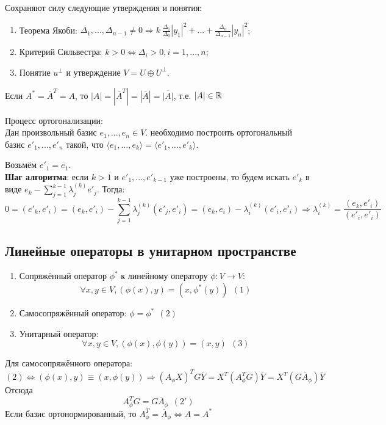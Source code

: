 Сохраняют силу следующие утверждения и понятия:
\begin{enumerate}
    \item Теорема Якоби: $\Delta_1,...,\Delta_{n-1} \neq 0 \Longrightarrow k ~ \frac{\Delta_1}{\Delta_0}|y_1|^2 + ... + \frac{\Delta_n}{\Delta_{n-1}}|y_n|^2$;
    \item Критерий Сильвестра: $k > 0 \Longleftrightarrow \Delta_i > 0, i = 1,...,n$;
    \item Понятие $u^\perp$ и утверждение $V = U \oplus U^\perp$.
\end{enumerate}
\begin{remark}
    Если $A^* = \overline{A}^T = A$, то $|A| = |\overline{A}^T| = |\overline{A}| = \overline{|A|}$, т.е. $|A| \in \mathbb{R}$
\end{remark}
\begin{algorithm} Процесс ортогонализации:\\
    Дан произвольный базис $e_1,...,e_n \in V$. необходимо построить ортогональный базис $e'_1,...,e'_n$ такой, что $\langle e_1,...,e_k \rangle = \langle e'_1,...,e'_k \rangle$.
\end{algorithm}
Возьмём $e'_1 = e_1$.\\
\textbf{Шаг алгоритма}: если $k > 1$ и $e'_1,...,e'_{k-1}$ уже построены, то будем искать $e'_k$ в виде $e_k - \sum \limits_{j=1}^{k-1} \lambda_j^{(k)}e'_j$. Тогда:
$$0 = (e'_k, e'_i) = (e_k, e'_i) - \sum \limits_{j=1}^{k-1} \lambda_j^{(k)}(e'_j, e'_i) = (e_k, e_i) - \lambda_i^{(k)}(e'_i, e'_i) \Longrightarrow \lambda_i^{(k)} = \frac{(e_k, e'_i)}{(e'_i, e'_i)}$$ 
\subsection{Линейные операторы в унитарном пространстве}
\begin{enumerate}
    \item Сопряжённый оператор $\phi^*$ к линейному оператору $\phi: V \rightarrow V$:
    $$\forall x,y \in V, (\phi(x), y) = (x, \phi^*(y)) \ \ (1)$$
    \item Самосопряжённый оператор: $\phi = \phi^* \ \ (2)$
    \item Унитарный оператор:
    $$\forall x,y \in V, (\phi(x), \phi(y)) = (x, y) \ \ (3)$$
\end{enumerate}

Для самосопряжённого оператора:
$$(2) \Longleftrightarrow (\phi(x), y) \equiv (x, \phi(y)) \Longrightarrow (A_\phi X)^TG\overline{Y} = X^T(A_\phi^TG)\overline{Y} = X^T(G\overline{A}_\phi)\overline{Y}$$
Отсюда
$$A_\phi^TG = G\overline{A}_\phi \ \ (2')$$
Если базис ортонормированный, то $A_\phi^T = \overline{A}_\phi \Longleftrightarrow A = A^*$

